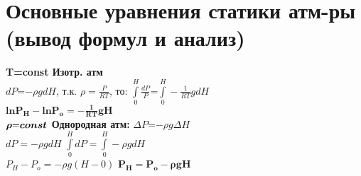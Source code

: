 
\section{Основные уравнения статики атм-ры (вывод формул и анализ)}
\textbf{T=const Изотр. атм}\\
$dP$=$-\rho gdH$, т.к. $\rho=\frac{P}{RT}$, то: $\int \limits_0^H \frac{dP}{P}$=$\int \limits_0^H -\frac{1}{RT}gdH$\\
\textbf{$\boldsymbol{lnP_H-lnP_o=-\frac{1}{RT}gH}$}\\

\textbf{$\boldsymbol{\rho$=$const}$ Однородная атм:} $\varDelta P$=$-\rho g\varDelta H$\\ $dP=-\rho gdH$ \hspace{5mm} $\int \limits_0^H dP=\int \limits_0^H -\rho gdH$\\
$P_H-P_o=-\rho g(H-0)$ \hspace{1mm} \textbf{$\boldsymbol{P_H=P_o-\rho gH}$}

